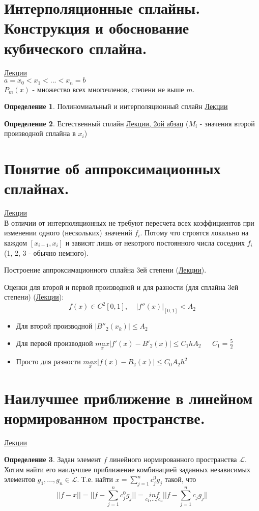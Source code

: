 \documentclass[specialist, subf, href, colorlinks=true, 12pt, times, mtpro, final]{disser}
\theoremstyle{definition}
\newtheorem{defn}{Определение}[section]
\begin{document}
	

\section {Интерполяционные сплайны. Конструкция и обоснование кубического сплайна.}
	\hyperlink {lects.22}{Лекции}\\
	$a = x_0 < x_1 < ... < x_n = b$\\
	$P_m(x)$ - множество всех многочленов, степени не выше $m$.
	\begin{defn}
		Полиномиальный и интерполяционный сплайн \hyperlink {lects.22}{Лекции}
	\end{defn}

	\begin{defn}
		Естественный сплайн \hyperlink {lects.23}{Лекции, 2ой абзац} ($M_i$ - значения второй производной сплайна в $x_i$)
	\end{defn}

\section {Понятие об аппроксимационных сплайнах.}
	\hyperlink {lects.25}{Лекции}\\
	В отличии от интерполяционных не требуют пересчета всех коэффициентов при изменении одного (нескольких) значений $f_i$. Потому что строятся локально на каждом $[x_{i-1}, x_i]$ и зависят лишь от некотрого постоянного числа соседних $f_i$ (1, 2, 3 - обычно немного).
	
	Построение аппроксимационного сплайна 3ей степени (\hyperlink {lects.25}{Лекции}).
	
	Оценки для второй и первой производной и для разности (для сплайна 3ей степени) (\hyperlink {lects.27}{Лекции}):
	$$
		f(x) \in C^2[0,1], \ \ \ \ \ |f''(x)|_{[0,1]} < A_2
	$$
	\begin{itemize}
		\item Для второй производной $|B''_2(x_k)| \le A_2$
		\item Для первой производной $\underset{x}{max}|f'(x)-B'_2(x)| \le C_1 h A_2 \ \ \ \ \ \  \ C_1 = \frac{5}{2}$
		\item Просто для разности $\underset{x}{max}|f(x)-B_2(x)| \le C_0 A_2 h^2$
			
	\end{itemize}
	
	
	

\section {Наилучшее приближение в линейном нормированном пространстве.}
	\hyperlink {lects.28}{Лекции}\\
	\begin{defn}
	Задан элемент $f$ линейного нормированного пространства $\mathcal{L}$. Хотим найти его наилучшее приближение комбинацией заданных независимых элементов $g_1, ..., g_n \in \mathcal{L}$. Т.е. найти $x = \sum\limits_{j = 1}^{n}c_j^0g_j$ такой, что
	$$
		||f - x|| = ||f - \sum\limits_{j = 1}^{n}c_j^0g_j|| = \underset{c_1,...,c_n}{inf} ||f - \sum\limits_{j = 1}^{n}c_jg_j||
	$$
	\end{defn}
\end{document}
